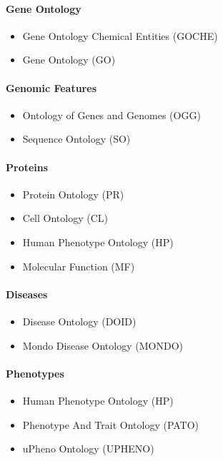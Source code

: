 \paragraph{Gene Ontology}
\begin{itemize}
\item Gene Ontology Chemical Entities (GOCHE)
\item Gene Ontology (GO)
\end{itemize}

\paragraph{Genomic Features}
\begin{itemize}
\item Ontology of Genes and Genomes (OGG)
\item Sequence Ontology (SO)
\end{itemize}

\paragraph{Proteins}
\begin{itemize}
\item Protein Ontology (PR)
\item Cell Ontology (CL)
\item Human Phenotype Ontology (HP)
\item Molecular Function (MF)
\end{itemize}
\bigskip

\paragraph{Diseases}
\begin{itemize}
\item Disease Ontology (DOID)
\item Mondo Disease Ontology (MONDO)
\end{itemize}
\bigskip

\paragraph{Phenotypes}
\begin{itemize}
\item Human Phenotype Ontology (HP)
\item Phenotype And Trait Ontology (PATO)
\item uPheno Ontology (UPHENO)
\end{itemize}

